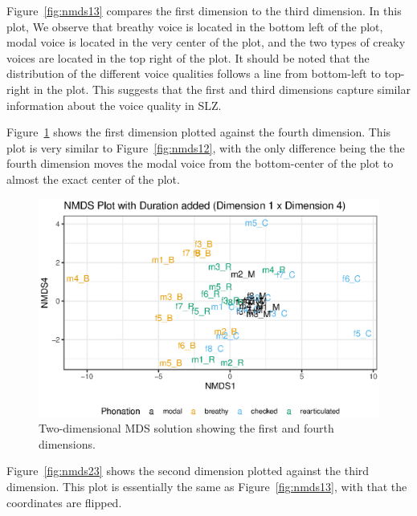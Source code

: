 Figure~\ref{fig:nmds13} compares the first dimension to the third dimension. In this plot, We observe that breathy voice is located in the bottom left of the plot, modal voice is located in the very center of the plot, and the two types of creaky voices are located in the top right of the plot. It should be noted that the distribution of the different voice qualities follows a line from bottom-left to top-right in the plot. This suggests that the first and third dimensions capture similar information about the voice quality in SLZ.


Figure~\ref{fig:nmds14} shows the first dimension plotted against the fourth dimension. This plot is very similar to Figure~\ref{fig:nmds12}, with the only difference being the the fourth dimension moves the modal voice from the bottom-center of the plot to almost the exact center of the plot.

\begin{figure}[!ht]
    \centering
    \includegraphics[width = 0.9\linewidth]{images/MDS/nmds14_dur.eps}
    \caption{Two-dimensional MDS solution showing the first and fourth dimensions.}
    \label{fig:nmds14}
\end{figure}

Figure~\ref{fig:nmds23} shows the second dimension plotted against the third dimension. This plot is essentially the same as Figure~\ref{fig:nmds13}, with that the coordinates are flipped.

